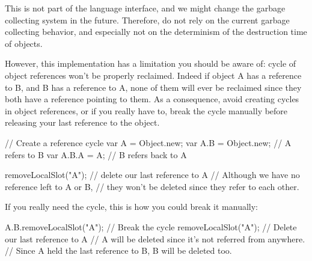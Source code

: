 This is not part of the language interface, and we might change the garbage
collecting system in the future. Therefore, do not rely on the current
garbage collecting behavior, and especially not on the determinism of the
destruction time of objects.

However, this implementation has a limitation you should be aware of: cycle
of object references won't be properly reclaimed. Indeed if object A has a
reference to B, and B has a reference to A, none of them will ever be
reclaimed since they both have a reference pointing to them. As a
consequence, avoid creating cycles in object references, or if you really
have to, break the cycle manually before releasing your last reference to
the object.

\begin{urbiunchecked}
// Create a reference cycle
var A = Object.new;
var A.B = Object.new; // A refers to B
var A.B.A = A; // B refers back to A

removeLocalSlot("A"); // delete our last reference to A
// Although we have no reference left to A or B,
// they won't be deleted since they refer to each other.
\end{urbiunchecked}

If you really need the cycle, this is how you could break it manually:

\begin{urbiunchecked}
A.B.removeLocalSlot("A"); // Break the cycle
removeLocalSlot("A"); // Delete our last reference to A
// A will be deleted since it's not referred from anywhere.
// Since A held the last reference to B, B will be deleted too.
\end{urbiunchecked}


